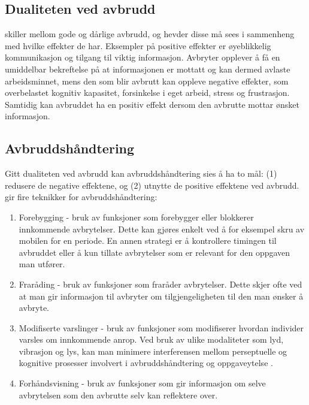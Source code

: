 \subsection{Dualiteten ved avbrudd}
\label{sec:dualitet}
\citet{Grundgeiger09} skiller mellom gode og dårlige avbrudd, og hevder disse må sees i sammenheng med hvilke effekter de har. Eksempler på positive effekter er øyeblikkelig kommunikasjon og tilgang til viktig informasjon. Avbryter opplever å få en umiddelbar bekreftelse på at informasjonen er mottatt og kan dermed avlaste arbeidsminnet, mens den som blir avbrutt kan oppleve negative effekter, som overbelastet kognitiv kapasitet, forsinkelse i eget arbeid, stress og frustrasjon. Samtidig kan avbruddet ha en positiv effekt dersom den avbrutte mottar ønsket informasjon.

\subsection{Avbruddshåndtering}
\label{håndtering}
Gitt dualiteten ved avbrudd kan avbruddshåndtering sies å ha to mål: (1) redusere de negative effektene, og (2) utnytte de positive effektene ved avbrudd. \citet{Grandhi10} gir fire teknikker for avbruddshåndtering:
\begin{enumerate}        
\item Forebygging - bruk av funksjoner som forebygger eller blokkerer innkommende avbrytelser. Dette kan gjøres enkelt ved å for eksempel skru av mobilen for en periode. En annen strategi er å kontrollere timingen til avbruddet eller å kun tillate avbrytelser som er relevant for den oppgaven man utfører.

\item Fraråding - bruk av funksjoner som fraråder avbrytelser. Dette skjer ofte ved at man gir informasjon til avbryter om tilgjengeligheten til den man ønsker å avbryte. 

\item Modifiserte varslinger - bruk av funksjoner som modifiserer hvordan individer varsles om innkommende anrop. Ved bruk av ulike modaliteter som lyd, vibrasjon og lys, kan man minimere interferensen mellom perseptuelle og kognitive prosesser involvert i avbruddshåndtering og oppgaveytelse \citep{Harr07}.

\item Forhåndsvisning - bruk av funksjoner som gir informasjon om selve avbrytelsen som den avbrutte selv kan reflektere over.   
\end{enumerate}


